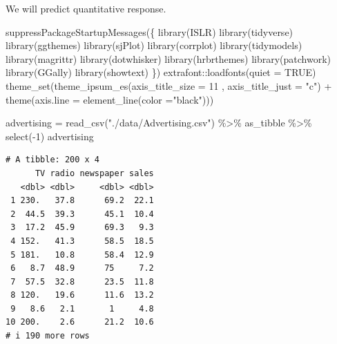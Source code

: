 \documentclass[
  letterpaper,
  DIV=11,
  numbers=noendperiod]{scrreprt}
\newenvironment{Shaded}{\begin{snugshade}}{\end{snugshade}}
\newcommand{\AttributeTok}[1]{\textcolor[rgb]{0.65,0.35,0.00}{#1}}
\newcommand{\ConstantTok}[1]{\textcolor[rgb]{0.85,0.12,0.09}{#1}}
\newcommand{\DecValTok}[1]{\textcolor[rgb]{0.47,0.16,0.63}{#1}}
\newcommand{\FunctionTok}[1]{\textcolor[rgb]{0.02,0.16,0.49}{#1}}
\newcommand{\NormalTok}[1]{\textcolor[rgb]{0.33,0.33,0.33}{#1}}
\newcommand{\OtherTok}[1]{\textcolor[rgb]{0.85,0.12,0.09}{#1}}
\newcommand{\SpecialCharTok}[1]{\textcolor[rgb]{0.00,0.46,0.62}{#1}}
\newcommand{\StringTok}[1]{\textcolor[rgb]{0.00,0.50,0.00}{#1}}
\begin{document}
We will predict quantitative response.

\begin{Shaded}
\begin{Highlighting}[]
\FunctionTok{suppressPackageStartupMessages}\NormalTok{(\{}
\FunctionTok{library}\NormalTok{(ISLR)}
\FunctionTok{library}\NormalTok{(tidyverse)}
\FunctionTok{library}\NormalTok{(ggthemes)}
\FunctionTok{library}\NormalTok{(sjPlot)}
\FunctionTok{library}\NormalTok{(corrplot)}
\FunctionTok{library}\NormalTok{(tidymodels)}
\FunctionTok{library}\NormalTok{(magrittr)}
\FunctionTok{library}\NormalTok{(dotwhisker)}
\FunctionTok{library}\NormalTok{(hrbrthemes)}
\FunctionTok{library}\NormalTok{(patchwork)}
\FunctionTok{library}\NormalTok{(GGally)}
\FunctionTok{library}\NormalTok{(showtext)}
\NormalTok{\})}
\NormalTok{extrafont}\SpecialCharTok{::}\FunctionTok{loadfonts}\NormalTok{(}\AttributeTok{quiet =} \ConstantTok{TRUE}\NormalTok{)}
\FunctionTok{theme\_set}\NormalTok{(}\FunctionTok{theme\_ipsum\_es}\NormalTok{(}\AttributeTok{axis\_title\_size =} \DecValTok{11}\NormalTok{ , }\AttributeTok{axis\_title\_just =} \StringTok{"c"}\NormalTok{) }\SpecialCharTok{+} \FunctionTok{theme}\NormalTok{(}\AttributeTok{axis.line =} \FunctionTok{element\_line}\NormalTok{(}\AttributeTok{color =}\StringTok{"black"}\NormalTok{)))}
\end{Highlighting}
\end{Shaded}

\begin{Shaded}
\begin{Highlighting}[]
\NormalTok{advertising }\OtherTok{=} \FunctionTok{read\_csv}\NormalTok{(}\StringTok{"./data/Advertising.csv"}\NormalTok{) }\SpecialCharTok{\%\textgreater{}\%}\NormalTok{ as\_tibble }\SpecialCharTok{\%\textgreater{}\%} \FunctionTok{select}\NormalTok{(}\SpecialCharTok{{-}}\DecValTok{1}\NormalTok{)}
\NormalTok{advertising}
\end{Highlighting}
\end{Shaded}

\begin{verbatim}
# A tibble: 200 x 4
      TV radio newspaper sales
   <dbl> <dbl>     <dbl> <dbl>
 1 230.   37.8      69.2  22.1
 2  44.5  39.3      45.1  10.4
 3  17.2  45.9      69.3   9.3
 4 152.   41.3      58.5  18.5
 5 181.   10.8      58.4  12.9
 6   8.7  48.9      75     7.2
 7  57.5  32.8      23.5  11.8
 8 120.   19.6      11.6  13.2
 9   8.6   2.1       1     4.8
10 200.    2.6      21.2  10.6
# i 190 more rows
\end{verbatim}
\end{document}
